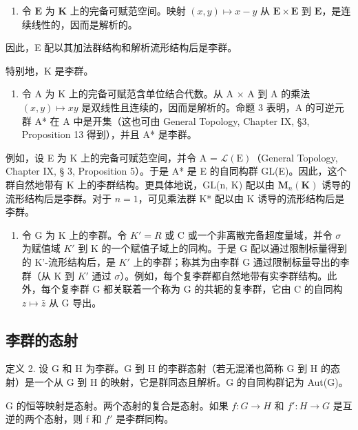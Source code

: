 \begin{enumerate}
\def\labelenumi{(\arabic{enumi})}
\tightlist
\item
  令 \(\mathbf{E}\) 为 \(\mathbf{K}\) 上的完备可赋范空间。映射 \((x, y) \mapsto x - y\) 从 \(\mathbf{E} \times \mathbf{E}\) 到 \(\mathbf{E}\)，是连续线性的，因而是解析的。
\end{enumerate}

因此，E 配以其加法群结构和解析流形结构后是李群。

特别地，K 是李群。

\begin{enumerate}
\def\labelenumi{(\arabic{enumi})}
\setcounter{enumi}{1}
\tightlist
\item
  令 A 为 K 上的完备可赋范含单位结合代数。从 A × A 到 A 的乘法 \((x,y)\mapsto xy\) 是双线性且连续的，因而是解析的。命题 3 表明，A 的可逆元群 A* 在 A 中是开集（这也可由 General Topology, Chapter IX, §3, Proposition 13 得到），并且 A* 是李群。
\end{enumerate}

例如，设 E 为 K 上的完备可赋范空间，并令 A = \(\mathcal{L}(\mathrm{E})\)（General Topology, Chapter IX, § 3, Proposition 5）。于是 A* 是 E 的自同构群 GL(E)。因此，这个群自然地带有 K 上的李群结构。更具体地说，GL(n, K) 配以由 \(\mathbf{M}_{n}(\mathbf{K})\) 诱导的流形结构后是李群。对于 \(n = 1\)，可见乘法群 K* 配以由 K 诱导的流形结构后是李群。

\begin{enumerate}
\def\labelenumi{(\arabic{enumi})}
\setcounter{enumi}{2}
\tightlist
\item
  令 G 为 K 上的李群。令 \(K' = R\) 或 C 或一个非离散完备超度量域，并令 \(\sigma\) 为赋值域 \(K'\) 到 K 的一个赋值子域上的同构。于是 G 配以通过限制标量得到的 K'-流形结构后，是 \(K'\) 上的李群；称其为由李群 G 通过限制标量导出的李群（从 K 到 \(K'\) 通过 \(\sigma\)）。例如，每个复李群都自然地带有实李群结构。此外，每个复李群 G 都关联着一个称为 G 的共轭的复李群，它由 C 的自同构 \(z \mapsto \bar{z}\) 从 G 导出。
\end{enumerate}

\subsection{李群的态射}

定义 2. 设 G 和 H 为李群。G 到 H 的李群态射（若无混淆也简称 G 到 H 的态射）是一个从 G 到 H 的映射，它是群同态且解析。G 的自同构群记为 Aut(G)。

G 的恒等映射是态射。两个态射的复合是态射。如果 \(f: G \to H\) 和 \(f': H \to G\) 是互逆的两个态射，则 f 和 \(f'\) 是李群同构。

